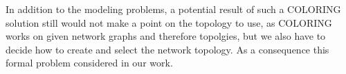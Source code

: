     In addition to the modeling problems, a potential result of such a COLORING solution still would not make a point on the topology to use,
    as COLORING works on given network graphs and therefore topolgies, but we also have to decide how to create and select the network topology.
    As a consequence this formal problem considered in our work.

